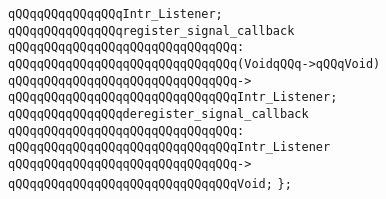 \verb|qQQqqQQqqQQqqQQqIntr_Listener;|\newline
\newline
\verb|qQQqqQQqqQQqqQQqregister_signal_callback|\newline
\verb|qQQqqQQqqQQqqQQqqQQqqQQqqQQqqQQq:|\newline
\verb|qQQqqQQqqQQqqQQqqQQqqQQqqQQqqQQq(VoidqQQq->qQQqVoid)|\newline
\verb|qQQqqQQqqQQqqQQqqQQqqQQqqQQqqQQq->|\newline
\verb|qQQqqQQqqQQqqQQqqQQqqQQqqQQqqQQqIntr_Listener;|\newline
\newline
\verb|qQQqqQQqqQQqqQQqderegister_signal_callback|\newline
\verb|qQQqqQQqqQQqqQQqqQQqqQQqqQQqqQQq:|\newline
\verb|qQQqqQQqqQQqqQQqqQQqqQQqqQQqqQQqIntr_Listener|\newline
\verb|qQQqqQQqqQQqqQQqqQQqqQQqqQQqqQQq->|\newline
\verb|qQQqqQQqqQQqqQQqqQQqqQQqqQQqqQQqVoid;|\newline
\newline
\verb|};|\newline


